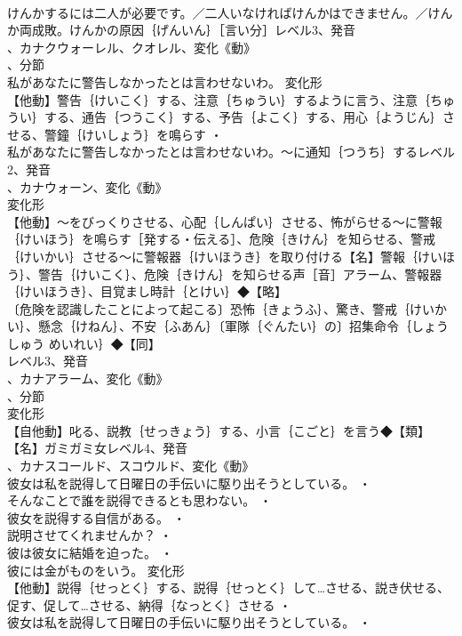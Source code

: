 \documentclass[8pt]{extreport}
\begin{document}
\begin{CJK}{UTF8}{min}
\\	けんかするには二人が必要です。／二人いなければけんかはできません。／けんか両成敗。けんかの原因｛げんいん｝［言い分］レベル3、発音
\\	、カナクウォーレル、クオレル、変化《動》
\\	、分節
\\	私があなたに警告しなかったとは言わせないわ。	変化形 
\\	【他動】警告｛けいこく｝する、注意｛ちゅうい｝するように言う、注意｛ちゅうい｝する、通告｛つうこく｝する、予告｛よこく｝する、用心｛ようじん｝させる、警鐘｛けいしょう｝を鳴らす ・
\\	私があなたに警告しなかったとは言わせないわ。～に通知｛つうち｝するレベル2、発音
\\	、カナウォーン、変化《動》
\\	変化形 
\\	【他動】～をびっくりさせる、心配｛しんぱい｝させる、怖がらせる～に警報｛けいほう｝を鳴らす［発する・伝える］、危険｛きけん｝を知らせる、警戒｛けいかい｝させる～に警報器｛けいほうき｝を取り付ける【名】警報｛けいほう｝、警告｛けいこく｝、危険｛きけん｝を知らせる声［音］アラーム、警報器｛けいほうき｝、目覚まし時計｛とけい｝◆【略】
\\	〔危険を認識したことによって起こる〕恐怖｛きょうふ｝、驚き、警戒｛けいかい｝、懸念｛けねん｝、不安｛ふあん｝〔軍隊｛ぐんたい｝の〕招集命令｛しょうしゅう めいれい｝◆【同】
\\	レベル3、発音
\\	、カナアラーム、変化《動》
\\	、分節
\\	変化形 
\\	【自他動】叱る、説教｛せっきょう｝する、小言｛こごと｝を言う◆【類】
\\	【名】ガミガミ女レベル4、発音
\\	、カナスコールド、スコウルド、変化《動》
\\	彼女は私を説得して日曜日の手伝いに駆り出そうとしている。 ・
\\	そんなことで誰を説得できるとも思わない。 ・
\\	彼女を説得する自信がある。 ・
\\	説明させてくれませんか？ ・
\\	彼は彼女に結婚を迫った。 ・
\\	彼には金がものをいう。	変化形 
\\	【他動】説得｛せっとく｝する、説得｛せっとく｝して…させる、説き伏せる、促す、促して…させる、納得｛なっとく｝させる ・
\\	彼女は私を説得して日曜日の手伝いに駆り出そうとしている。 ・

\end{CJK}
\end{document}
